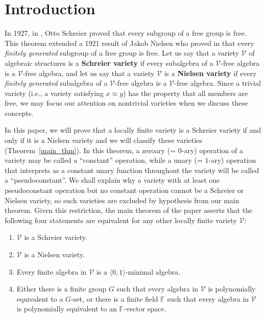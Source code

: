 \documentclass[12pt]{amsart}
\theoremstyle{definition}
\numberwithin{equation}{section}
\begin{document}
\section{Introduction}\label{Ind_sec}
In 1927, in \cite{schreier}, Otto Schreier
proved that every
subgroup of a free group is free.
This theorem extended a 1921 result of
Jakob Nielsen who proved in
\cite{nielsen}
that every \emph{finitely generated}
subgroup of a free group is free.
Let us say that a variety $\mathcal V$
of algebraic structures
is a \textbf{Schreier variety}
if every subalgebra of a $\mathcal V$-free
algebra is a $\mathcal V$-free algebra, and 
let us say that a variety $\mathcal V$
is a \textbf{Nielsen variety}
if every \emph{finitely generated}
subalgebra of a $\mathcal V$-free algebra is a $\mathcal V$-free algebra.
Since a trivial variety (i.e., a variety satisfying $x\approx y$)
has the property
that all members are free, we may focus our
attention on nontrivial varieties when we discuss
these concepts.

In this paper, we will prove that a locally finite
variety is a 
Schreier variety if and only if it is a Nielsen variety
and we will classify these varieties (Theorem~\ref{main_thm}).
In this theorem, a zeroary (= $0$-ary) operation of a variety
may be called a ``constant'' operation, while a
unary (= $1$-ary) operation that interprets as a constant
unary function throughout the variety
will be called a ``pseudoconstant''.
We shall explain why a variety with at least one pseudoconstant operation
but no constant operation cannot be a Schreier or Nielsen variety,
so such varieties are excluded by hypothesis from our main theorem.
Given this restriction, the main theorem of the paper asserts that
the following four statements are equivalent for any
other locally finite
variety $\mathcal{V}$:
\begin{enumerate}
\item $\mathcal{V}$ is a Schreier variety.
\item $\mathcal{V}$ is a Nielsen variety.
\item Every finite algebra in $\mathcal{V}$ is a
  $\langle 0,1\rangle$-minimal algebra.
\item Either there is a finite group $G$ such that
  every algebra in $\mathcal{V}$ is polynomially
  equivalent to a $G$-set, or
there is a finite field $\mathbb{F}$ such that
  every algebra in $\mathcal{V}$ is polynomially
  equivalent to an $\mathbb{F}$-vector space.
\end{enumerate}
\end{document}
